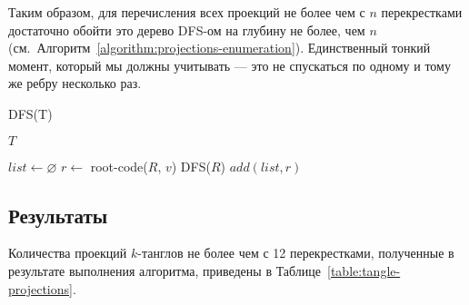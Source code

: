 		Таким образом, для перечисления всех проекций не более чем с $n$ перекрестками достаточно обойти это дерево DFS-ом на глубину
		не более, чем $n$ (см.~Алгоритм~\ref{algorithm:projections-enumeration}). Единственный тонкий момент, который мы должны
		учитывать --- это не спускаться по одному и тому же ребру несколько раз.

		\begin{algorithm}[ht]
			\caption{DFS(T)\label{algorithm:projections-enumeration}}
			\begin{algorithmic}[1]
				\PRINT $T$
					\RETURN
				\ENDIF

				\STATE $list \leftarrow \varnothing$
							\STATE $r \leftarrow $ root-code($R$, $v$)
								\STATE DFS($R$)
								\STATE $add(list, r)$
							\ENDIF
						\ENDIF
					\ENDIF
				\ENDFOR
			\end{algorithmic}
		\end{algorithm}

	\subsection{Результаты}

		Количества проекций $k$-танглов не более чем с 12 перекрестками, полученные в результате выполнения алгоритма, приведены
		в Таблице~\ref{table:tangle-projections}.

